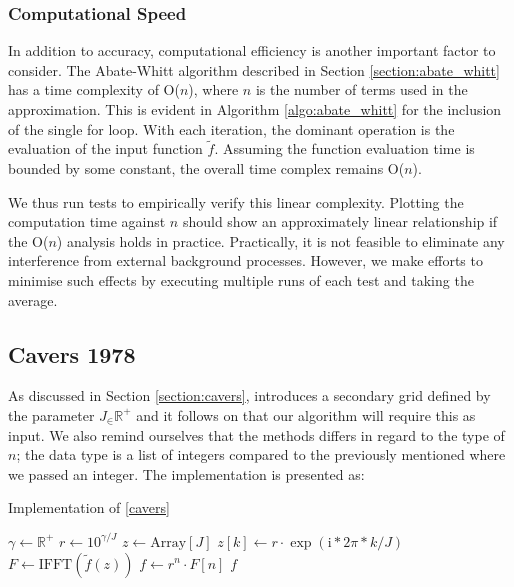 \documentclass[a4paper]{report}
\begin{document}
\subsubsection{Computational Speed}\label{section:aw_speed}
In addition to accuracy, computational efficiency is another important factor to consider. The Abate-Whitt algorithm described in Section \ref{section:abate_whitt} has a time complexity of O($n$), where $n$ is the number of terms used in the approximation. This is evident in Algorithm \ref{algo:abate_whitt} for the inclusion of the single for loop. With each iteration, the dominant operation is the evaluation of the input function $\tilde{f}$. Assuming the function evaluation time is bounded by some constant, the overall time complex remains O($n$). 

We thus run tests to empirically verify this linear complexity. Plotting the computation time against $n$ should show an approximately linear relationship if the O($n$) analysis holds in practice. Practically, it is not feasible to eliminate any interference from external background processes. However, we make efforts to minimise such effects by executing multiple runs of each test and taking the average.

\subsection{Cavers 1978}
As discussed in Section \ref{section:cavers}, \citet{Cavers1978FFT} introduces a secondary grid defined by the parameter $J_\in \mathbb{R}^+$ and it follows on that our algorithm will require this as input. We also remind ourselves that the methods differs in regard to the type of $n$; the data type is a list of integers compared to the previously mentioned where we passed an integer. The implementation is presented as:

\begin{algorithm}[H]
    \caption{Implementation of \autoref{cavers}}
    \label{algo:cavers}
    \begin{algorithmic}[1]
        	\State $\gamma \gets \mathbb{R}^+$
            \State $r \gets 10^{\gamma / J}$
            \State $z \gets \text{Array}[J]$
                \State $z[k] \gets r \cdot \exp(\text{i} * 2 \pi * k / J)$
            \EndFor
            \State $F \gets \text{IFFT}(\tilde{f}(z))$
            \State $f \gets r^n \cdot F[n]$
            \State \Return $f$ 
        \EndProcedure
    \end{algorithmic}
\end{algorithm}
\end{document}
